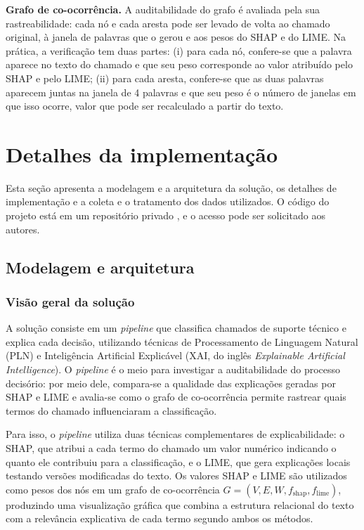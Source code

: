 \documentclass[
    12pt,                %
    openright,           %
    oneside,             %
    a4paper,             %
    english,             %
    brazil               %
]{abntex2}
\begin{document}
\textbf{Grafo de co-ocorrência.} A auditabilidade do grafo é avaliada pela sua rastreabilidade: cada nó e cada aresta pode ser levado de volta ao chamado original, à janela de palavras que o gerou e aos pesos do SHAP e do LIME. Na prática, a verificação tem duas partes: (i) para cada nó, confere-se que a palavra aparece no texto do chamado e que seu peso corresponde ao valor atribuído pelo SHAP e pelo LIME; (ii) para cada aresta, confere-se que as duas palavras aparecem juntas na janela de 4 palavras e que seu peso é o número de janelas em que isso ocorre, valor que pode ser recalculado a partir do texto.

\section{Detalhes da implementação}
\label{sec:implementacao}

Esta seção apresenta a modelagem e a arquitetura da solução, os detalhes de implementação e a coleta e o tratamento dos dados utilizados. O código do projeto está em um repositório privado \cite{santos2026codigo}, e o acesso pode ser solicitado aos autores.

\subsection{Modelagem e arquitetura}
\label{sec:solucao}

\subsubsection{Visão geral da solução}

A solução consiste em um \textit{pipeline} que classifica chamados de 
suporte técnico e explica cada decisão, utilizando técnicas de 
Processamento de Linguagem Natural (PLN) e Inteligência Artificial 
Explicável (XAI, do inglês \textit{Explainable Artificial Intelligence}). O \textit{pipeline} é o meio para investigar a 
auditabilidade do processo decisório: por meio dele, compara-se a 
qualidade das explicações geradas por SHAP e LIME e avalia-se como o 
grafo de co-ocorrência permite rastrear quais termos do chamado 
influenciaram a classificação.

Para isso, o \textit{pipeline} utiliza duas técnicas complementares de 
explicabilidade: o SHAP, que atribui a cada termo do chamado um 
valor numérico indicando o quanto ele contribuiu para a 
classificação, e o LIME, que gera explicações locais testando 
versões modificadas do texto. Os valores SHAP e LIME são utilizados como pesos dos nós 
em um grafo de co-ocorrência $G = (V, E, W, f_{\text{shap}}, f_{\text{lime}})$, 
produzindo uma visualização gráfica que combina a estrutura relacional do 
texto com a relevância explicativa de cada termo segundo ambos 
os métodos.
\end{document}
